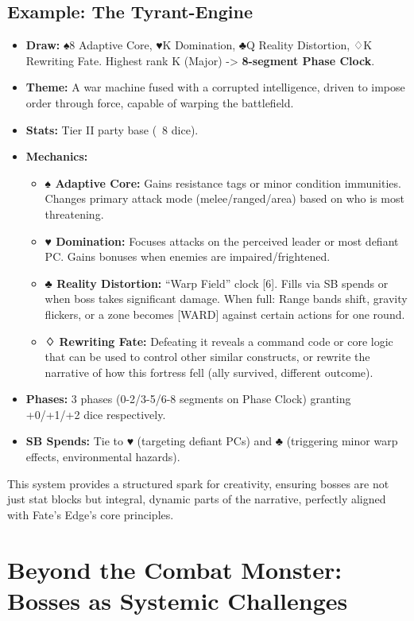 \subsection{Example: The Tyrant-Engine}

\begin{itemize}
    \item \textbf{Draw:} ♠8 Adaptive Core, ♥K Domination, ♣Q Reality Distortion, ♢K Rewriting Fate. Highest rank K (Major) -> \textbf{8-segment Phase Clock}.
    \item \textbf{Theme:} A war machine fused with a corrupted intelligence, driven to impose order through force, capable of warping the battlefield.
    \item \textbf{Stats:} Tier II party base (~8 dice).
    \item \textbf{Mechanics:}
    \begin{itemize}
        \item \textbf{♠ Adaptive Core:} Gains resistance tags or minor condition immunities. Changes primary attack mode (melee/ranged/area) based on who is most threatening.
        \item \textbf{♥ Domination:} Focuses attacks on the perceived leader or most defiant PC. Gains bonuses when enemies are impaired/frightened.
        \item \textbf{♣ Reality Distortion:} ``Warp Field'' clock [6]. Fills via SB spends or when boss takes significant damage. When full: Range bands shift, gravity flickers, or a zone becomes [WARD] against certain actions for one round.
        \item \textbf{♢ Rewriting Fate:} Defeating it reveals a command code or core logic that can be used to control other similar constructs, or rewrite the narrative of how this fortress fell (ally survived, different outcome).
    \end{itemize}
    \item \textbf{Phases:} 3 phases (0-2/3-5/6-8 segments on Phase Clock) granting +0/+1/+2 dice respectively.
    \item \textbf{SB Spends:} Tie to ♥ (targeting defiant PCs) and ♣ (triggering minor warp effects, environmental hazards).
\end{itemize}

This system provides a structured spark for creativity, ensuring bosses are not just stat blocks but integral, dynamic parts of the narrative, perfectly aligned with Fate's Edge's core principles.

\section{Beyond the Combat Monster: Bosses as Systemic Challenges}
\label{sec:noncombat-bosses}

